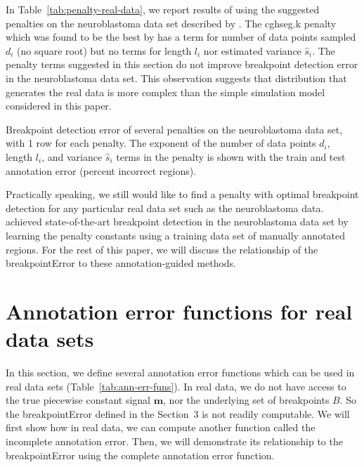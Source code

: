 \documentclass{article}
\newcommand{\tab}[3][H]{
  \begin{table}[#1]
    \begin{center}
          
    \end{center}
    \caption{#3}
    \label{tab:#2}
  \end{table}
}
\begin{document}
In Table~\ref{tab:penalty-real-data}, we report results of using the
suggested penalties on the neuroblastoma data set described by
\citet{HOCKING-breakpoints}. The cghseg.k penalty which was found to
be the best by \citet{HOCKING-breakpoints} has a term for number of
data points sampled $d_i$ (no square root) but no terms for length
$l_i$ nor estimated variance $\hat s_i$. The penalty terms suggested
in this section do not improve breakpoint detection error in the
neuroblastoma data set. This observation suggests that distribution
that generates the real data is more complex than the simple
simulation model considered in this paper.

\tab{penalty-real-data}{Breakpoint detection error of several
  penalties on the neuroblastoma data set, with 1 row for each
  penalty. The exponent of the number of data points $d_i$, length
  $l_i$, and variance $\hat s_i$ terms in the penalty is shown with
  the train and test annotation error (percent incorrect regions). }

Practically speaking, we still would like to find a penalty with
optimal breakpoint detection for any particular real data set such as
the neuroblastoma data. 
\citet{HOCKING-penalties} achieved state-of-the-art breakpoint
detection in the neuroblastoma data set by learning
the penalty constants using a training data set of manually annotated
regions. 
For the rest
of this paper, we will discuss the relationship of the breakpointError
to these annotation-guided methods.

\newpage

\section{Annotation error functions for real data sets}
\label{sec:relaxation}

In this section, we define several annotation error functions which
can be used in real data sets (Table~\ref{tab:ann-err-funs}).  In real
data, we do not have access to the true piecewise constant signal
$\mathbf m$, nor the underlying set of breakpoints $B$. So the
breakpointError defined in the Section~3 is not readily
computable. We will first show how in real data, we can compute
another function called the incomplete annotation error. Then, we will
demonstrate its relationship to the breakpointError using the complete
annotation error function.
\end{document}
